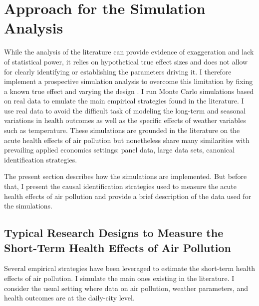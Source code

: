 \documentclass[12pt]{article}
\begin{document}



\section{Approach for the Simulation Analysis}\label{section_simulations}

    While the analysis of the literature can provide evidence of exaggeration and lack of statistical power, it relies on hypothetical true effect sizes and does not allow for clearly identifying or establishing the parameters driving it. I therefore implement a prospective simulation analysis to overcome this limitation by fixing a known true effect and varying the design \citep[for additional guidance on power calculations in complex observational settings]{altoe_enhancing_2020, black_simulated_2022}. I run Monte Carlo simulations based on real data to emulate the main empirical strategies found in the literature. I use real data to avoid the difficult task of modeling the long-term and seasonal variations in health outcomes as well as the specific effects of weather variables such as temperature. These simulations are grounded in the literature on the acute health effects of air pollution but nonetheless share many similarities with prevailing applied economics settings: panel data, large data sets, canonical identification strategies.

    The present section describes how the simulations are implemented. But before that, I present the causal identification strategies used to measure the acute health effects of air pollution and provide a brief description of the data used for the simulations.
        
    \subsection{Typical Research Designs to Measure the Short-Term Health Effects of Air Pollution}
        
        Several empirical strategies have been leveraged to estimate the short-term health effects of air pollution. I simulate the main ones existing in the literature. I consider the usual setting where data on air pollution, weather parameters, and health outcomes are at the daily-city level.
        
\end{document}
